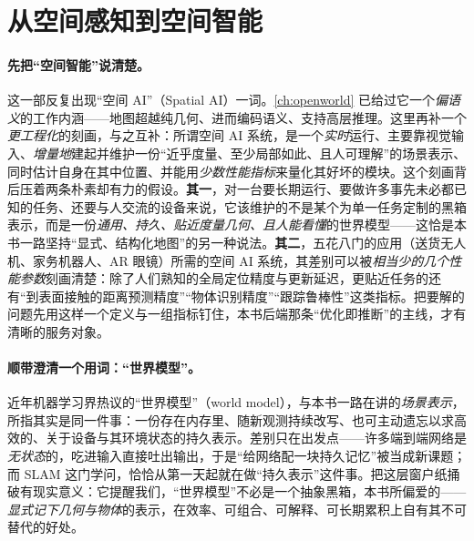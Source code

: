 \section{从空间感知到空间智能}
\label{sec:epilogue-toward}

\paragraph{先把“空间智能”说清楚。}
这一部反复出现“空间 AI”（Spatial AI）一词。\cref{ch:openworld} 已给过它一个\emph{偏语义}的工作内涵——地图超越纯几何、进而编码语义、支持高层推理。这里再补一个\emph{更工程化}的刻画，与之互补\cite{davison2026computational}：所谓空间 AI 系统，是一个\emph{实时}运行、主要靠视觉输入、\emph{增量地}建起并维护一份“近乎度量、至少局部如此、且人可理解”的场景表示、同时估计自身在其中位置、并能用\emph{少数性能指标}来量化其好坏的模块。这个刻画背后压着两条朴素却有力的假设。\textbf{其一}，对一台要长期运行、要做许多事先未必都已知的任务、还要与人交流的设备来说，它该维护的不是某个为单一任务定制的黑箱表示，而是一份\emph{通用、持久、贴近度量几何、且人能看懂}的世界模型——这恰是本书一路坚持“显式、结构化地图”的另一种说法。\textbf{其二}，五花八门的应用（送货无人机、家务机器人、AR 眼镜）所需的空间 AI 系统，其差别可以被\emph{相当少的几个性能参数}刻画清楚：除了人们熟知的全局定位精度与更新延迟，更贴近任务的还有“到表面接触的距离预测精度”“物体识别精度”“跟踪鲁棒性”这类指标。把要解的问题先用这样一个定义与一组指标钉住，本书后端那条“优化即推断”的主线，才有清晰的服务对象。

\paragraph{顺带澄清一个用词：“世界模型”。}
近年机器学习界热议的“世界模型”（world model），与本书一路在讲的\emph{场景表示}，所指其实是同一件事\cite{davison2026computational}：一份存在内存里、随新观测持续改写、也可主动遗忘以求高效的、关于设备与其环境状态的持久表示。差别只在出发点——许多端到端网络是\emph{无状态}的，吃进输入直接吐出输出，于是“给网络配一块持久记忆”被当成新课题；而 SLAM 这门学问，恰恰从第一天起就在做“持久表示”这件事。把这层窗户纸捅破有现实意义：它提醒我们，“世界模型”不必是一个抽象黑箱，本书所偏爱的——\emph{显式记下几何与物体}的表示，在效率、可组合、可解释、可长期累积上自有其不可替代的好处。


